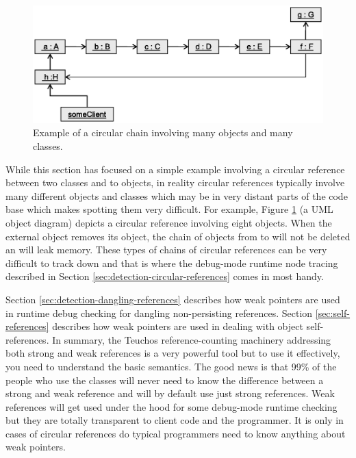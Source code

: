\documentclass[pdf,ps2pdf,11pt]{SANDreport}
\begin{document}
{\bsinglespace
\begin{figure}
\begin{center}
\includegraphics*[angle=0,scale=0.65]{CircularChain}
\end{center}
\caption{
\label{fig:CircularChain}
Example of a circular chain involving many objects and many classes.}
\end{figure}
\esinglespace}


While this section has focused on a simple example involving a circular
reference between two classes and to objects, in reality circular
references typically involve many different objects and classes which
may be in very distant parts of the code base which makes spotting
them very difficult.  For example, Figure {}\ref{fig:CircularChain} (a
UML object diagram) depicts a circular reference involving eight
objects.  When the external {} object removes its
{} object, the chain of objects from {} to
{} will not be deleted an will leak memory.  These types of
chains of circular references can be very difficult to track down and
that is where the debug-mode runtime node tracing described in Section
{}\ref{sec:detection-circular-references} comes in most handy.

Section {}\ref{sec:detection-dangling-references} describes how weak
pointers are used in runtime debug checking for dangling
non-persisting references.  Section {}\ref{sec:self-references}
describes how weak pointers are used in dealing with object
self-references.  In summary, the Teuchos reference-counting machinery
addressing both strong and weak references is a very powerful tool but
to use it effectively, you need to understand the basic semantics.
The good news is that 99\% of the people who use the classes
{} will never need to know the difference between a
strong and weak reference and will by default use just strong
references.  Weak references will get used under the hood for some
debug-mode runtime checking but they are totally transparent to client
code and the programmer.  It is only in cases of circular references
do typical programmers need to know anything about weak pointers.
\end{document}
